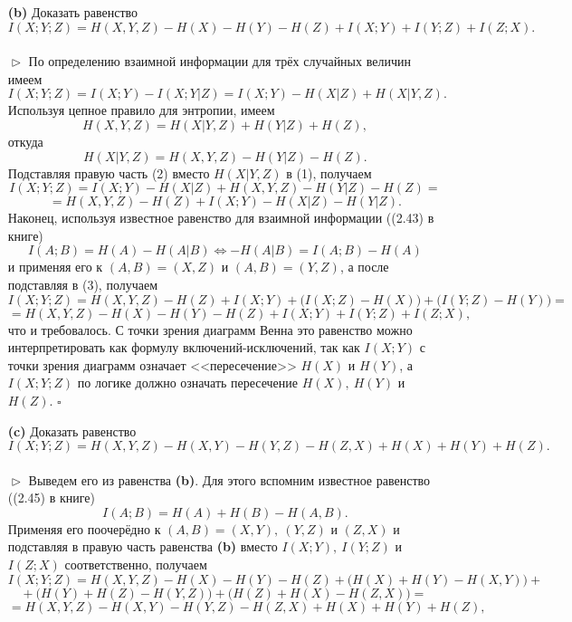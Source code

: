 \documentclass{article}
\begin{document}
\begin{enumerate}
\begin{enumerate}
\\
\item[\bfseries (b)] Доказать равенство $I(X; Y; Z) = H(X, Y, Z) - H(X) - H(Y) - H(Z) + I(X; Y) + I(Y; Z) + I(Z; X).$
\\\\$\vartriangleright$ По определению взаимной информации для трёх случайных величин имеем
\begin{equation} I(X; Y; Z) = I(X; Y) - I(X; Y | Z) = I(X; Y) - H(X|Z) + H(X|Y, Z). \end{equation}
Используя цепное правило для энтропии, имеем
$$H(X, Y, Z) = H(X|Y, Z) + H(Y | Z) + H(Z),$$ откуда
\begin{equation} H(X | Y, Z) = H(X, Y, Z) - H(Y|Z) - H(Z).\end{equation}
Подставляя правую часть (2) вместо $ H(X | Y, Z)$ в (1), получаем
$$I(X; Y; Z) = I(X; Y) - H(X|Z) + H(X, Y, Z) - H(Y|Z) - H(Z) =$$
\newpage
\begin{equation} = H(X, Y, Z) - H(Z) + I(X; Y) - H(X|Z) - H(Y|Z). \end{equation}
Наконец, используя известное равенство для взаимной информации ((2.43) в книге)
$$I(A; B) = H(A) - H(A|B) \Longleftrightarrow -H(A|B) = I(A; B) - H(A)$$  и применяя его к $(A, B) = (X, Z)$ и $(A, B) = (Y, Z)$, а после подставляя в (3), получаем
$$I(X; Y; Z) = H(X, Y, Z) - H(Z) + I(X; Y) + \Big(I(X; Z) - H(X)\Big) + \Big(I(Y; Z) - H(Y)\Big) =$$
$$= H(X, Y, Z) - H(X) - H(Y) - H(Z) + I(X; Y) + I(Y; Z) + I(Z; X),$$
что и требовалось. С точки зрения диаграмм Венна это равенство можно интерпретировать как формулу включений-исключений, так как $I(X; Y)$ с точки зрения диаграмм означает <<пересечение>> $H(X)$ и $H(Y)$, а $I(X; Y; Z)$ по логике должно означать пересечение $H(X),\ H(Y)$ и $H(Z)$. $\square$
\\
\item[\bfseries (c)] Доказать равенство $I(X; Y; Z) = H(X, Y, Z) - H(X, Y) - H(Y, Z) - H(Z, X) + H(X) + H(Y) + H(Z).$
\\\\$\vartriangleright$ Выведем его из равенства {\bfseries (b)}. Для этого вспомним известное равенство ((2.45) в книге)
$$I(A; B) = H(A) + H(B) - H(A, B).$$
Применяя его поочерёдно к $(A, B) = (X, Y),\ (Y, Z)$ и $(Z, X)$ и подставляя в правую часть равенства {\bfseries (b)} вместо $I(X; Y),\ I(Y; Z)$ и $I(Z; X)$ соответственно, получаем
$$I(X; Y; Z) = H(X, Y, Z) - H(X) - H(Y) - H(Z) + \Big(H(X) + H(Y) - H(X, Y)\Big) +$$
$$+\ \Big(H(Y) + H(Z) - H(Y, Z)\Big) + \Big(H(Z) + H(X) - H(Z, X)\Big) = $$
$$= H(X, Y, Z) - H(X, Y) - H(Y, Z) - H(Z, X) + H(X) + H(Y) + H(Z),$$

\end{enumerate}
\end{enumerate}
\end{document}
